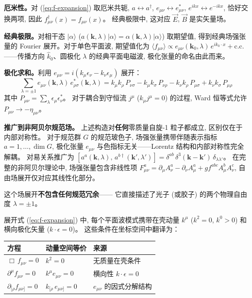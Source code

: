 \textbf{厄米性。}对 (\ref{eq:f-expansion}) 取厄米共轭,
$a\leftrightarrow a^\dagger$, $e_{\mu\nu}\leftrightarrow e^*_{\mu\nu}$,
$e^{ikx}\leftrightarrow e^{-ikx}$, 恰好交换两项, 因此
$f_{\mu\nu}^\dagger(x) = f_{\mu\nu}(x)$。
经典极限中, 这对应 $\vec{E}$, $\vec{B}$ 是实矢量场。

\textbf{经典极限。}对相干态 $|\alpha\rangle$
($a(\mathbf{k},\lambda)|\alpha\rangle = \alpha(\mathbf{k},\lambda)|\alpha\rangle$) 取期望值,
得到经典场强张量的 Fourier 展开。对于单色平面波, 期望值化为
$\langle f_{\mu\nu}\rangle \propto e_{\mu\nu}(\mathbf{k}_0,\lambda)\,e^{ik_0\cdot x} + \text{c.c.}$
——传播方向 $\hat{k}_0$、圆极化 $\lambda$ 的经典平面电磁波, 极化张量的命名由此而来。

\textbf{极化求和。}利用 $e_{\mu\nu}=i(k_\mu\epsilon_\nu - k_\nu\epsilon_\mu)$ 展开：
\begin{equation}
    \sum_{\lambda=\pm 1} e_{\mu\nu}(\mathbf{k},\lambda)\,e^*_{\rho\sigma}(\mathbf{k},\lambda)
    = k_\mu k_\rho\,P_{\nu\sigma} - k_\mu k_\sigma\,P_{\nu\rho}
    - k_\nu k_\rho\,P_{\mu\sigma} + k_\nu k_\sigma\,P_{\mu\rho}
\end{equation}
其中 $P_{\mu\nu}=\sum_\lambda \epsilon_\mu\epsilon^*_\nu$。
对于耦合到守恒流 $j^\mu$ ($k_\mu j^\mu=0$) 的过程,
Ward 恒等式允许 $P_{\mu\nu}\to -\eta_{\mu\nu}$。

\textbf{推广到非阿贝尔规范场。}
上述构造对\textbf{任何}零质量自旋-1 粒子都成立, 区别仅在于内部对称性。
对于规范群 $G$ 的规范玻色子, 场强张量携带伴随表示指标 $a=1,\ldots,\dim G$,
极化张量 $e_{\mu\nu}$ 与色指标无关——Lorentz 结构和内部对称性完全解耦。
对易关系推广为
$[a^a(\mathbf{k},\lambda),\,a^{b\dagger}(\mathbf{k}',\lambda')]
= \delta^{ab}\,\delta^3(\mathbf{k}-\mathbf{k}')\,\delta_{\lambda\lambda'}$。
在完整的非阿贝尔理论中, 场强张量包含非线性项
$F^a_{\mu\nu} = \partial_\mu A^a_\nu - \partial_\nu A^a_\mu + gf^{abc}A^b_\mu A^c_\nu$,
自由场展开仅对应其线性化部分。

这个场展开\textbf{不包含任何规范冗余}——
它直接描述了光子 (或胶子) 的两个物理自由度 $\lambda=\pm 1$。



展开式 (\ref{eq:f-expansion}) 中, 每个平面波模式携带在壳动量 $k^\mu$ ($k^2=0$, $k^0>0$)
和横向极化矢量 ($k\cdot\epsilon=0$)。
这些条件在坐标空间中翻译为：

\begin{center}
\begin{tabular}{l l l}
\hline
方程 & 动量空间等价 & 来源 \\
\hline
$\Box\,f_{\mu\nu}=0$ & $k^2=0$ & 无质量在壳条件 \\[3pt]
$\partial^\mu f_{\mu\nu}=0$ & $k^\mu e_{\mu\nu}=0$ & 横向性 $k\cdot\epsilon=0$ \\[3pt]
$\partial_{[\rho}f_{\mu\nu]}=0$ & $k_{[\rho}\,e_{\mu\nu]}=0$ &
$e_{\mu\nu}$ 的因式分解结构 \\
\hline
\end{tabular}
\end{center}

